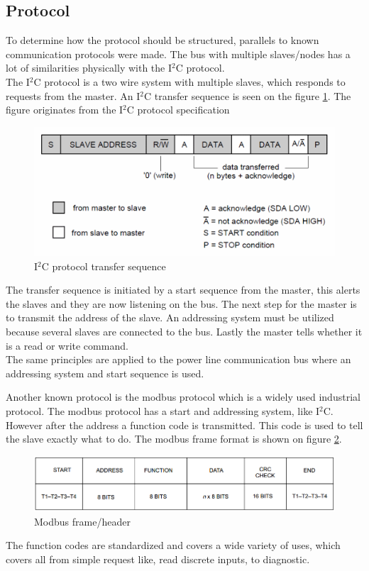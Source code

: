 \subsection{Protocol}
To determine how the protocol should be structured, parallels to known communication protocols were made. The bus with multiple slaves/nodes has a lot of similarities physically with the I$^2$C protocol.\\
The I$^2$C protocol is a two wire system with multiple slaves, which responds to requests from the master. An I$^2$C transfer sequence is seen on the figure \ref{fig:i2cheader}. The figure originates from the I$^2$C protocol specification 
\begin{figure}[H]
	\centering
	\includegraphics[width=.8\textwidth]{billeder/10technologystudies/7-bit-address-writing}
	\caption{I$^2$C protocol transfer sequence}
	\label{fig:i2cheader}
\end{figure}
The transfer sequence is initiated by a start sequence from the master, this alerts the slaves and they are now listening on the bus. The next step for the master is to transmit the address of the slave. An addressing system must be utilized because several slaves are connected to the bus. Lastly the master tells whether it is a read or write command. \\
The same principles are applied to the power line communication bus where an addressing system and start sequence is used.

Another known protocol is the modbus protocol which is a widely used industrial protocol. The modbus protocol has a start and addressing system, like I$^2$C. However after the address a function code is transmitted. This code is used to tell the slave exactly what to do. The modbus frame format is shown on figure \ref{fig:modbusframe}.
\begin{figure}[H]
	\centering
	\includegraphics[width=.8\textwidth]{billeder/10technologystudies/modbusframe}
	\caption{Modbus frame/header}
	\label{fig:modbusframe}
\end{figure}
The function codes are standardized and covers a wide variety of uses, which covers all from simple request like, read discrete inputs, to diagnostic.
